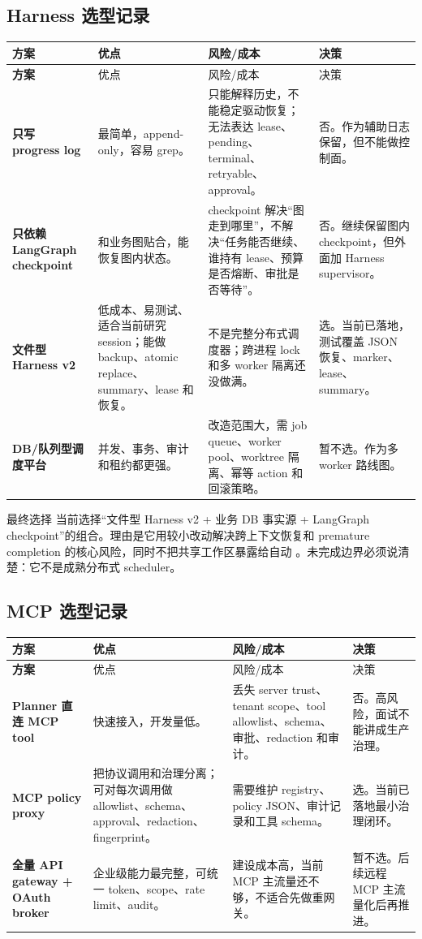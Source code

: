 \subsection{Harness 选型记录}
\begin{longtable}{>{\bfseries}p{}p{}p{}p{}}
\toprule
方案 & 优点 & 风险/成本 & 决策 \\
\midrule
\endfirsthead
\toprule
方案 & 优点 & 风险/成本 & 决策 \\
\midrule
\endhead
只写 progress log & 最简单，append-only，容易 grep。 & 只能解释历史，不能稳定驱动恢复；无法表达 lease、pending、terminal、retryable、approval。 & 否。作为辅助日志保留，但不能做控制面。 \\
只依赖 LangGraph checkpoint & 和业务图贴合，能恢复图内状态。 & checkpoint 解决“图走到哪里”，不解决“任务能否继续、谁持有 lease、预算是否熔断、审批是否等待”。 & 否。继续保留图内 checkpoint，但外面加 Harness supervisor。 \\
文件型 Harness v2 & 低成本、易测试、适合当前研究 session；能做 backup、atomic replace、summary、lease 和恢复。 & 不是完整分布式调度器；跨进程 lock 和多 worker 隔离还没做满。 & 选。当前已落地，测试覆盖 JSON 恢复、marker、lease、summary。 \\
DB/队列型调度平台 & 并发、事务、审计和租约都更强。 & 改造范围大，需 job queue、worker pool、worktree 隔离、幂等 action 和回滚策略。 & 暂不选。作为多 worker 路线图。 \\
\bottomrule
\end{longtable}

\begin{analysisBox}{最终选择}
当前选择“文件型 Harness v2 + 业务 DB 事实源 + LangGraph checkpoint”的组合。理由是它用较小改动解决跨上下文恢复和 premature completion 的核心风险，同时不把共享工作区暴露给自动 。未完成边界必须说清楚：它不是成熟分布式 scheduler。
\end{analysisBox}

\subsection{MCP 选型记录}
\begin{longtable}{>{\bfseries}p{}p{}p{}p{}}
\toprule
方案 & 优点 & 风险/成本 & 决策 \\
\midrule
\endfirsthead
\toprule
方案 & 优点 & 风险/成本 & 决策 \\
\midrule
\endhead
Planner 直连 MCP tool & 快速接入，开发量低。 & 丢失 server trust、tenant scope、tool allowlist、schema、审批、redaction 和审计。 & 否。高风险，面试不能讲成生产治理。 \\
MCP policy proxy & 把协议调用和治理分离；可对每次调用做 allowlist、schema、approval、redaction、fingerprint。 & 需要维护 registry、policy JSON、审计记录和工具 schema。 & 选。当前已落地最小治理闭环。 \\
全量 API gateway + OAuth broker & 企业级能力最完整，可统一 token、scope、rate limit、audit。 & 建设成本高，当前 MCP 主流量还不够，不适合先做重网关。 & 暂不选。后续远程 MCP 主流量化后再推进。 \\
\bottomrule
\end{longtable}

